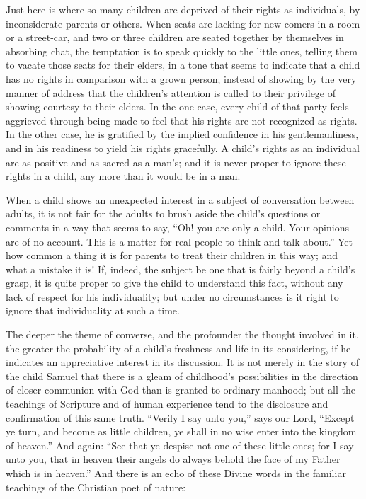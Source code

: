 \documentclass[
]{book}
\begin{document}
Just here is where so many children are deprived of their rights as individuals, by inconsiderate parents or others. When seats are lacking for new comers in a room or a street-car, and two or three children are seated together by themselves in absorbing chat, the temptation is to speak quickly to the little ones, telling them to vacate those seats for their elders, in a tone that seems to indicate that a child has no rights in comparison with a grown person; instead of showing by the very manner of address that the children's attention is called to their privilege of showing courtesy to their elders. In the one case, every child of that party feels aggrieved through being made to feel that his rights are not recognized as rights. In the other case, he is gratified by the implied confidence in his gentlemanliness, and in his readiness to yield his rights gracefully. A child's rights as an individual are as positive and as sacred as a man's; and it is never proper to ignore these rights in a child, any more than it would be in a man.

When a child shows an unexpected interest in a subject of conversation between adults, it is not fair for the adults to brush aside the child's questions or comments in a way that seems to say, ``Oh! you are only a child. Your opinions are of no account. This is a matter for real people to think and talk about.'' Yet how common a thing it is for parents to treat their children in this way; and what a mistake it is! If, indeed, the subject be one that is fairly beyond a child's grasp, it is quite proper to give the child to understand this fact, without any lack of respect for his individuality; but under no circumstances is it right to ignore that individuality at such a time.

The deeper the theme of converse, and the profounder the thought involved in it, the greater the probability of a child's freshness and life in its considering, if he indicates an appreciative interest in its discussion. It is not merely in the story of the child Samuel that there is a gleam of childhood's possibilities in the direction of closer communion with God than is granted to ordinary manhood; but all the teachings of Scripture and of human experience tend to the disclosure and confirmation of this same truth. ``Verily I say unto you,'' says our Lord, ``Except ye turn, and become as little children, ye shall in no wise enter into the kingdom of heaven.'' And again: ``See that ye despise not one of these little ones; for I say unto you, that in heaven their angels do always behold the face of my Father which is in heaven.'' And there is an echo of these Divine words in the familiar teachings of the Christian poet of nature:
\end{document}
